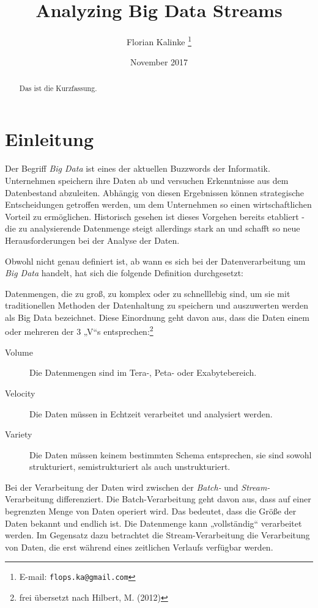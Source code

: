 \documentclass[a4paper,11pt]{scrartcl}
\begin{document}
\title{Analyzing Big Data Streams}
\author{Florian Kalinke%
  \thanks{E-mail: \texttt{flops.ka@gmail.com}}}
  \date{November 2017}
  \maketitle

  \begin{abstract}
    Das ist die Kurzfassung.
  \end{abstract}

  \tableofcontents

  \section{Einleitung}
  Der Begriff \textit{Big Data} ist eines der aktuellen Buzzwords der Informatik.
  Unternehmen speichern ihre Daten ab und versuchen Erkenntnisse aus dem
  Datenbestand abzuleiten. Abhängig von diesen Ergebnissen können strategische
  Entscheidungen getroffen werden, um dem Unternehmen so einen wirtschaftlichen
  Vorteil zu ermöglichen. Historisch gesehen ist dieses Vorgehen bereits
  etabliert - die zu analysierende Datenmenge steigt allerdings stark an und
  schafft so neue Herausforderungen bei der Analyse der
  Daten.\cite[S.~1]{freiknecht2014}

  Obwohl nicht genau definiert ist, ab wann es sich bei der Datenverarbeitung um
  \textit{Big Data} handelt, hat sich die folgende Definition durchgesetzt:

  Datenmengen, die zu groß, zu komplex oder zu schnelllebig sind, um sie mit
  traditionellen Methoden der Datenhaltung zu speichern und auszuwerten werden
  als Big Data bezeichnet. Diese Einordnung geht davon aus, dass die Daten einem
  oder mehreren der 3 „V“s entsprechen:\footnote{frei übersetzt nach Hilbert,
  M. (2012)}
  \begin{description}
    \item[Volume] Die Datenmengen sind im Tera-, Peta- oder Exabytebereich.
    \item[Velocity] Die Daten müssen in Echtzeit verarbeitet und analysiert
      werden.
    \item[Variety] Die Daten müssen keinem bestimmten Schema entsprechen, sie
      sind sowohl strukturiert, semistrukturiert als auch unstrukturiert.
  \end{description}

  Bei der Verarbeitung der Daten wird zwischen der \textit{Batch-} und
  \textit{Stream-}Verarbeitung differenziert. Die Batch-Verarbeitung geht davon
  aus, dass auf einer begrenzten Menge von Daten operiert wird. Das bedeutet,
  dass die Größe der Daten bekannt und endlich ist. Die Datenmenge kann
  „vollständig“ verarbeitet werden. Im Gegensatz dazu betrachtet die
  Stream-Verarbeitung die Verarbeitung von Daten, die erst während eines
  zeitlichen Verlaufs verfügbar werden.\cite[S.~439]{kleppmann17}
\end{document}
